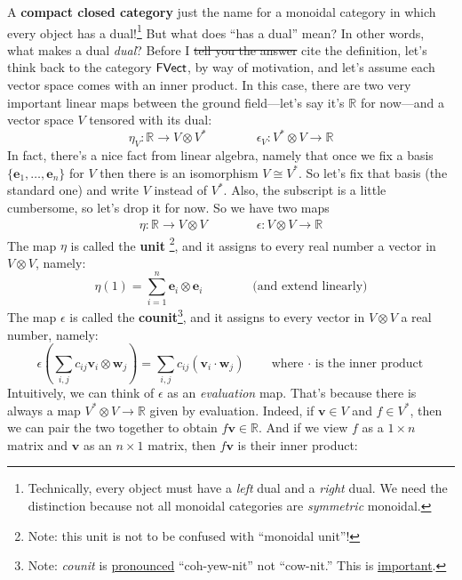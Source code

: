 \documentclass{tufte-handout-tai}
\newcommand{\cat}[1]{{\normalfont\textsf{#1}}}
\theoremstyle{plain}
\theoremstyle{definition}
\theoremstyle{remark}
\begin{document}
\noindent A \textbf{compact closed category} just the name for a monoidal category in which every object has a dual!\footnote{Technically, every object must have a \textit{left} dual and a \textit{right} dual. We need the distinction because not all monoidal categories are \textit{symmetric} monoidal.} But what does ``has a dual'' mean? In other words, what makes a dual \textit{dual}? Before I \sout{tell you the  answer} cite the definition, let's think back to the category $\cat{FVect}$, by way of motivation, and let's assume each vector space comes with an inner product. In this case, there are two very important linear maps between the ground field---let's say it's $\mathbb{R}$ for now---and a vector space $V$ tensored with its dual:
\[
\eta_V\colon \mathbb{R}\to V\otimes V^* \qquad \qquad \epsilon_V\colon V^*\otimes V\to\mathbb{R}
\]
In fact, there's a nice fact from linear algebra, namely that once we fix a basis $\{\mathbf{e}_1,\ldots,\mathbf{e}_n\}$ for $V$ then there is an isomorphism $V\cong V^*$. So let's fix that basis (the standard one) and write $V$ instead of $V^*$. Also, the subscript is a little cumbersome, so let's drop it for now.
So we have two maps
\begin{align}\label{lis:ucounit}
\eta\colon \mathbb{R}\to V\otimes V \qquad \qquad \epsilon\colon V\otimes V\to\mathbb{R}
\end{align}
The map $\eta$ is called the \textbf{unit} \footnote{Note: this unit is not to be confused with ``monoidal unit''!}, and it assigns to every real number a vector in $V\otimes V$, namely:
\[\eta(1)=\sum_{i=1}^n \mathbf{e}_i\otimes \mathbf{e}_i \qquad \qquad\text{(and extend linearly)}\]
The map $\epsilon$ is called the \textbf{counit}\footnote{Note: \textit{counit} is \href{https://twitter.com/math3ma/status/965271641847685120}{pronounced} ``coh-yew-nit'' not ``cow-nit.'' This is \href{https://twitter.com/math3ma/status/965255364286574594}{important}.}, and it assigns to every vector in $V\otimes V$ a real number, namely:
\[\epsilon\left(\sum_{i,j}c_{ij}\mathbf{v}_i\otimes \mathbf{w}_j\right)=\sum_{i,j}c_{ij}(\mathbf{v}_i\cdot\mathbf{w}_j)\qquad\text{where $\cdot$ is the inner product}\]
	Intuitively, we can think of $\epsilon$ as an \textit{evaluation} map. That's because there is always a map $V^*\otimes V\to\mathbb{R}$ given by evaluation. Indeed, if $\mathbf{v}\in V$ and $f\in V^*$, then we can pair the two together to obtain $f\mathbf{v}\in \mathbb{R}.$ And if we view $f$ as a $1\times n$ matrix and $\mathbf{v}$ as an $n\times 1$ matrix, then $f\mathbf{v}$ is their inner product:
\end{document}
